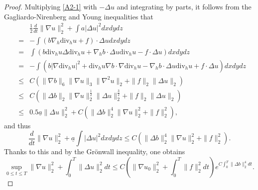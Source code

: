 \documentclass[12pt,reqno]{amsart}
\numberwithin{equation}{section}
\begin{document}
\begin{proof}
  Multiplying \eqref{A2-1} with $-\Delta u$ and integrating by parts, it follows from the Gagliardo-Nirenberg and Young inequalities that
  \begin{eqnarray*}
    &&\frac12\frac{d}{dt}\|\nabla u\|_2^2+\int a|\Delta u|^2dxdydz\\
    &=&-\int(b\nabla_h\text{div}_hu+f)\cdot\Delta u dxdydz\\
    &=&\int(b\text{div}_hu\Delta\text{div}_hu+\nabla_hb\cdot\Delta u\text{div}_hu-f\cdot\Delta u)dxdydz\\
    &=&-\int (b|\nabla\text{div}_hu|^2+\text{div}_hu\nabla b\cdot\nabla\text{div}_hu-\nabla_hb\cdot\Delta u\text{div}_hu+f\cdot\Delta u)dxdydz\\
    &\leq&C(\|\nabla b\|_6\|\nabla u\|_3\|\nabla^2u\|_2+\|f\|_2\|\Delta u\|_2)\\
    &\leq&C(\|\Delta b\|_2\|\nabla u\|_2^\frac12\|\Delta u\|_2^\frac32+\|f\|_2\|\Delta u\|_2)\\
    &\leq&0.5\underline a\|\Delta u\|_2^2+C\left(\|\Delta b\|_2^4\|\nabla u\|_2^2+\|f\|_2^2\right) ,
  \end{eqnarray*}
  and thus
  \begin{equation*}
    \frac{d}{dt}\|\nabla u\|_2^2+\underline a\int |\Delta u|^2dxdydz\leq C\left(\|\Delta b\|_2^4\|\nabla u\|_2^2+\|f\|_2^2\right).
  \end{equation*}
  Thanks to this and by the Gr\"onwall inequality, one obtains
  \begin{equation}
    \sup_{0\leq t\leq T}\|\nabla u\|_2^2+\int_0^T\|\Delta u\|_2^2dt\leq C\left(\|\nabla u_0\|_2^2+\int_0^T\|f\|_2^2dt\right)e^{C \int_0^T\|\Delta b\|_2^4dt}.\label{EST1U}
  \end{equation}


\end{proof}
\end{document}

